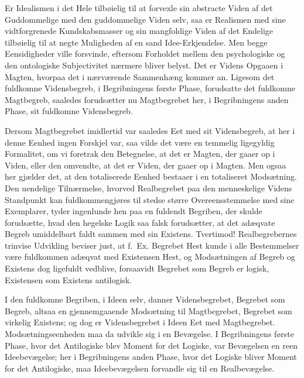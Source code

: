 \documentclass[12pt]{book}
\newcommand{\opage}[1]{\marginnote{\footnotesize\textit{[#1]}}}
\begin{document}
Er Idealismen i det Hele tilbøielig til at forvexle sin abstracte Viden af det Guddommelige med den
guddommelige Viden selv, saa er Realismen med sine vidtforgrenede Kundskabsmasser og sin
mangfoldige Viden af det Endelige tilbøielig til at negte Muligheden af en sand Idee-Erkjendelse.
Men begge Eensidigheder ville forsvinde, eftersom Forholdet mellem den psychologiske og den
ontologiske Subjectivitet nærmere bliver belyst. Det er Videns Opgaaen i Magten, hvorpaa det i
nærværende Sammenhæng kommer an. Ligesom det fuldkomne Vidensbegreb, i Begribningens første Phase,
forudsatte det fuldkomne Magtbegreb, saaledes forudsætter nu Magtbegrebet her, i Begribningens
anden Phase, sit fuldkomne Vidensbegreb.

Dersom Magtbegrebet imidlertid var saaledes Eet med sit Vidensbegreb, at her i denne Eenhed ingen
Forskjel var, saa vilde det være en temmelig ligegyldig Formalitet, om vi foretrak den Betegnelse,
at det er Magten, der gaaer op i Viden, eller den omvendte, at det er Viden, der gaaer op i Magten.
Men ogsaa her gjælder det, at den totaliserede Eenhed bestaaer i en totaliseret Modsætning. Den
uendelige Tilnærmelse, hvorved Realbegrebet paa den menneskelige Videns Standpunkt kan
fuldkommengjøres til stedse større Overeensstemmelse med sine Exemplarer, tyder ingenlunde hen paa
en fuldendt Begriben, der skulde forudsætte, hvad den hegelske Logik saa falsk forudsætter, at det
adæqvate Begreb umiddelbart faldt sammen med sin Existens. Tvertimod! Realbegrebernes trinvise
Udvikling beviser just, at f.\ Ex. Begrebet Hest kunde i alle Bestemmelser være fuldkommen adæqvat
med Existensen Hest, og Modsætningen af Begreb og Existens
\opage{200} dog ligefuldt vedblive, forsaavidt Begrebet som Begreb er logisk, Existensen som Existens
antilogisk.

I den fuldkomne Begriben, i Ideen selv, danner Vidensbegrebet, Begrebet som Begreb, altsaa en
gjennemgaaende Modsætning til Magtbegrebet, Begrebet som virkelig Existens; og dog er
Vidensbegrebet i Ideen Eet med Magtbegrebet. Modsætningseenheden maa da udvikle sig i en Bevægelse.
I Begribningens første Phase, hvor det Antilogiske blev Moment for det Logiske, var Bevægelsen en
reen Ideebevægelse; her i Begribningens anden Phase, hvor det Logiske bliver Moment for det
Antilogiske, maa Ideebevægelsen forvandle sig til en Realbevægelse.
\end{document}
